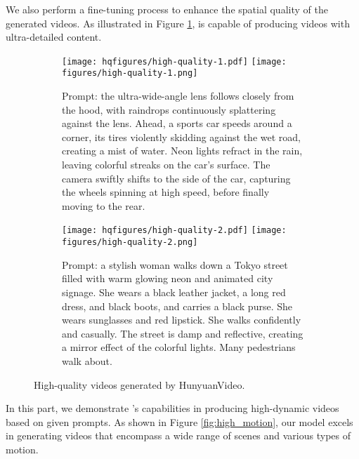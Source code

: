 
We also perform a fine-tuning process to enhance the spatial quality of the generated videos. As illustrated in Figure \ref{fig:high_quality}, \nameofmethod{} is capable of producing videos with ultra-detailed content.
\begin{figure}[!htbp]
    \centering
    \begin{subfigure}{\textwidth}
        \centering
        \ifhq
        \texttt{[image: hqfigures/high-quality-1.pdf]}
        \else
        \texttt{[image: figures/high-quality-1.png]}
        \fi
        \caption{Prompt: the ultra-wide-angle lens follows closely from the hood, with raindrops continuously splattering against the lens. Ahead, a sports car speeds around a corner, its tires violently skidding against the wet road, creating a mist of water. Neon lights refract in the rain, leaving colorful streaks on the car's surface. The camera swiftly shifts to the side of the car, capturing the wheels spinning at high speed, before finally moving to the rear.}
    \end{subfigure}
    \hfill
    \begin{subfigure}{\textwidth}
        \centering
        \ifhq
        \texttt{[image: hqfigures/high-quality-2.pdf]}
        \else
        \texttt{[image: figures/high-quality-2.png]}
        \fi
        \caption{Prompt: a stylish woman walks down a Tokyo street filled with warm glowing neon and animated city signage. She wears a black leather jacket, a long red dress, and black boots, and carries a black purse. She wears sunglasses and red lipstick. She walks confidently and casually. The street is damp and reflective, creating a mirror effect of the colorful lights. Many pedestrians walk about.}
    \end{subfigure}
    \caption{High-quality videos generated by HunyuanVideo.}
    \label{fig:high_quality}
\end{figure}

In this part, we demonstrate \nameofmethod{}'s capabilities in producing high-dynamic videos based on given prompts. As shown in Figure \ref{fig:high_motion}, our model excels in generating videos that encompass a wide range of scenes and various types of motion.

